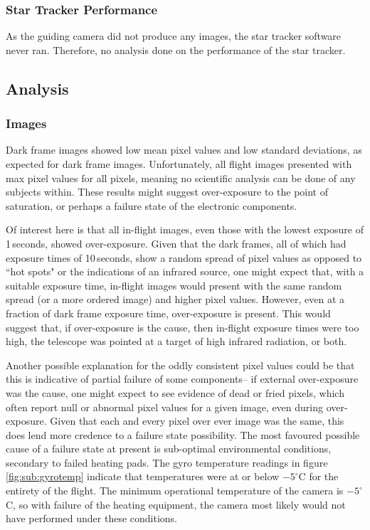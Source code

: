 {\subsubsection*{Star Tracker Performance}
As the guiding camera did not produce any images, the star tracker software never ran. Therefore, no analysis done on the performance of the star tracker.

\subsection{Analysis}

\subsubsection{Images}

Dark frame images showed low mean pixel values and low standard deviations, as expected for dark frame images. Unfortunately, all flight images presented with max pixel values for all pixels, meaning no scientific analysis can be done of any subjects within. These results might suggest over-exposure to the point of saturation, or perhaps a failure state of the electronic components.

Of interest here is that all in-flight images, even those with the lowest exposure of 1\,seconds, showed over-exposure. Given that the dark frames, all of which had exposure times of 10\,seconds, show a random spread of pixel values as opposed to ``hot spots" or the indications of an infrared source, one might expect that, with a suitable exposure time, in-flight images would present with the same random spread (or a more ordered image) and higher pixel values. However, even at a fraction of dark frame exposure time, over-exposure is present. This would suggest that, if over-exposure is the cause, then in-flight exposure times were too high, the telescope was pointed at a target of high infrared radiation, or both. 

Another possible explanation for the oddly consistent pixel values could be that this is indicative of partial failure of some components-- if external over-exposure was the cause, one might expect to see evidence of dead or fried pixels, which often report null or abnormal pixel values for a given image, even during over-exposure. Given that each and every pixel over ever image was the same, this does lend more credence to a failure state possibility. The most favoured possible cause of a failure state at present is sub-optimal environmental conditions, secondary to failed heating pads. The gyro temperature readings in figure \ref{fig:sub:gyrotemp} indicate that temperatures were at or below $-5^{\circ}$C for the entirety of the flight. The minimum operational temperature of the camera is $-5^{\circ}$C, so with failure of the heating equipment, the camera most likely would not have performed under these conditions. 

}
